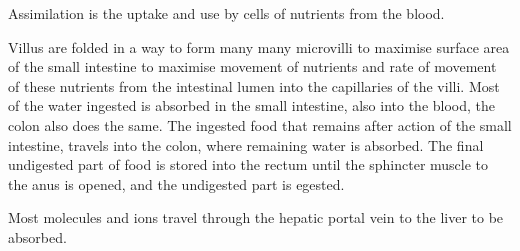 Assimilation is the uptake and use by cells of nutrients from the blood.

Villus are folded in a way to form many many microvilli to maximise surface area of the small
intestine to maximise movement of nutrients and rate of movement of these nutrients from the
intestinal lumen into the capillaries of the villi. Most of the water ingested is absorbed in the
small intestine, also into the blood, the colon also does the same. The ingested food that remains
after action of the small intestine, travels into the colon, where remaining water is absorbed.
The final undigested part of food is stored into the rectum until the sphincter muscle to the
anus is opened, and the undigested part is egested.

Most molecules and ions travel through the hepatic portal vein to the liver to be absorbed.
